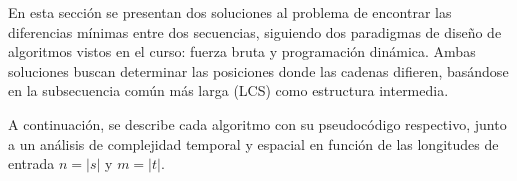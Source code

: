 En esta sección se presentan dos soluciones al problema de encontrar las diferencias mínimas entre dos secuencias, siguiendo dos paradigmas de diseño de algoritmos vistos en el curso: fuerza bruta y programación dinámica. Ambas soluciones buscan determinar las posiciones donde las cadenas difieren, basándose en la subsecuencia común más larga (LCS) como estructura intermedia.

A continuación, se describe cada algoritmo con su pseudocódigo respectivo, junto a un análisis de complejidad temporal y espacial en función de las longitudes de entrada $n = |s|$ y $m = |t|$.
